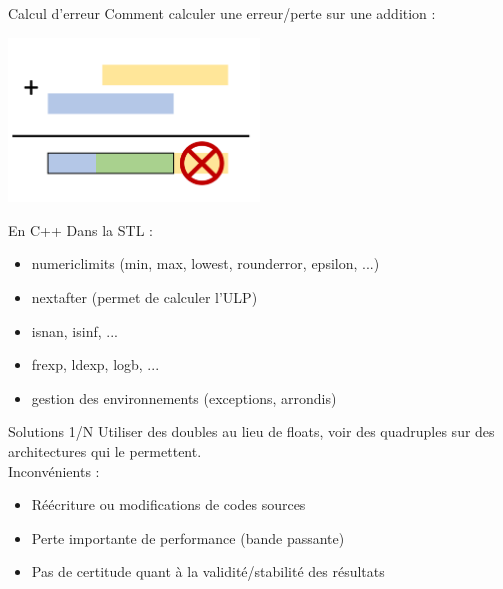 \documentclass{beamer}
\begin{document}
  
    \begin{frame}{Calcul d'erreur}
    Comment calculer une erreur/perte sur une addition :
    \begin{center}
      \includegraphics[width=0.5\textwidth]{addition}
      \errorcomputing
      \end{center}
        \end{frame}
        
  \begin{frame}{En C++}
    Dans la STL :
    \begin{itemize}
    \item numeric\textunderscore limits (min, max, lowest, round\textunderscore error, epsilon, ...)
    \item nextafter (permet de calculer l'ULP)
    \item isnan, isinf, ...
    \item frexp, ldexp, logb, ...
    \item gestion des environnements (exceptions, arrondis)
    \end{itemize}
  \end{frame}
  
    \begin{frame}{Solutions 1/N}
  Utiliser des doubles au lieu de floats, voir des quadruples sur des architectures qui le permettent. \\
  Inconvénients :
  \begin{itemize}
  \item Réécriture ou modifications de codes sources
  \item Perte importante de performance (bande passante)
  \item Pas de certitude quant à la validité/stabilité des résultats
  \end{itemize} 
  \end{frame}
  
\end{document}

